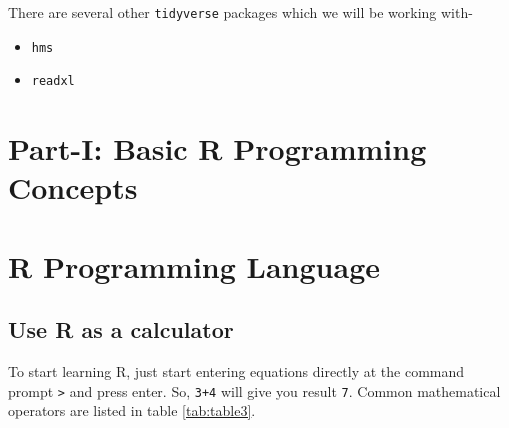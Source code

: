 \documentclass[
]{book}
\providecommand{\tightlist}{%
  \setlength{\itemsep}{0pt}\setlength{\parskip}{0pt}}
\begin{document}
There are several other \texttt{tidyverse} packages which we will be working with-

\begin{itemize}
\tightlist
\item
  \texttt{hms}
\item
  \texttt{readxl}
\end{itemize}

\hypertarget{part-i-basic-r-programming-concepts}{%
\chapter*{Part-I: Basic R Programming Concepts}\label{part-i-basic-r-programming-concepts}}

\hypertarget{r-programming-language}{%
\chapter{R Programming Language}\label{r-programming-language}}

\hypertarget{calculator}{%
\section{Use R as a calculator}\label{calculator}}

To start learning R, just start entering equations directly at the command prompt \texttt{\textgreater{}} and press enter. So, \texttt{3+4} will give you result \texttt{7}. Common mathematical operators are listed in table \ref{tab:table3}.
\end{document}
